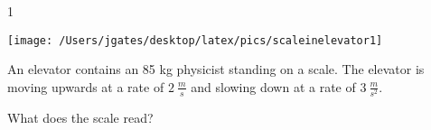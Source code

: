 
\AddToShipoutPicture*{\BackgroundPic}

\addtocounter {ProbNum} {1}

\begin{floatingfigure}[r]{.2\textwidth}
\texttt{[image: /Users/jgates/desktop/latex/pics/scaleinelevator1]}
\end{floatingfigure}
 
{\bf \Large{}} An elevator contains an 85 kg physicist standing on a scale. The elevator is moving upwards at a rate of ${2~\tfrac{m}{s}}$ and slowing down at a rate of ${3~\tfrac{m}{s^2}}$.

\bigskip
What does the scale read?




\vfill
\newpage
